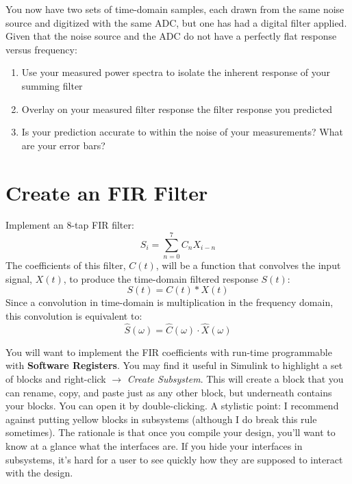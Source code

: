 \documentclass[11pt]{article}
\begin{document}
You now have two sets of time-domain samples, each drawn from the same noise source and digitized with the same
ADC, but one has had a digital filter applied.  Given that the noise source and the ADC do not have a perfectly
flat response versus frequency:
\begin{enumerate}
\item Use your measured power spectra to isolate the inherent response of your summing filter
\item Overlay on your measured filter response the filter response you predicted
\item Is your prediction accurate to within the noise of your measurements? What are your error bars?
\end{enumerate}

\section{Create an FIR Filter}

Implement an 8-tap FIR filter:
\begin{equation}
S_i = \sum_{n=0}^7{C_nX_{i-n}}
\end{equation}
The coefficients of this filter, $C(t)$, will be a function that convolves the input signal, $X(t)$, to produce the time-domain filtered response $S(t)$:
\begin{equation}
S(t) = C(t)\ast X(t)
\end{equation}
Since a convolution in time-domain is multiplication in the frequency domain,
this convolution is equivalent to:
\begin{equation}
\hat S(\omega) = \hat C(\omega)\cdot\hat X(\omega)
\end{equation}

You will want to implement the FIR coefficients with run-time programmable with {\bf Software Registers}.  You may find it useful in Simulink to
highlight a set of blocks and right-click $\rightarrow$ {\it Create Subsystem}.  This will create a block that
you can rename, copy, and paste just as any other block, but underneath contains your blocks.  You can open it
by double-clicking.  A stylistic point: I recommend against putting yellow blocks in subsystems (although I do
break this rule sometimes).  The rationale is that once you compile your design, you'll want to know at a 
glance what the interfaces are.  If you hide your interfaces in subsystems, it's hard for a user to see quickly how
they are supposed to interact with the design.
\end{document}
